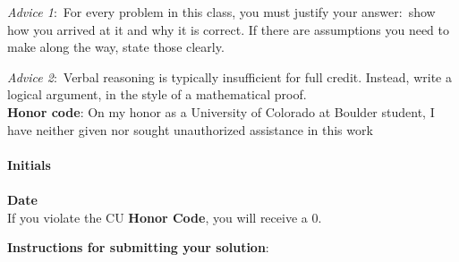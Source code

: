 \documentclass[12pt]{article}
\begin{document}
\renewcommand{\headrulewidth}{0.5pt}

\phantom{Test}

\begin{small}
\textit{Advice 1}:\ For every problem in this class, you must justify your answer:\ show how you arrived at it and why it is correct. If there are assumptions you need to make along the way, state those clearly.

\textit{Advice 2}:\ Verbal reasoning is typically insufficient for full credit. Instead, write a logical argument, in the style of a mathematical proof.\\

\textbf{Honor code}: On my honor as a University of Colorado at Boulder student,
I have neither given nor sought unauthorized assistance in this work\\  \\
\textbf{Initials} 
\fbox{%
\phantom{This is a really long name}} \\ \\
\textbf{Date} 
\fbox{%
\phantom{This is a really long name}} \\ 


If you violate the CU \textbf{Honor Code}, you will receive a 0.

\textbf{Instructions for submitting your solution}:
\vspace{-5mm} 


\end{small}
\end{document}
